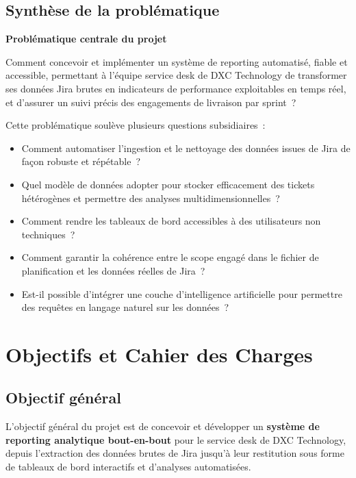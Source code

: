 \documentclass[12pt, a4paper]{report}
\begin{document}
\section{Synthèse de la problématique}

\begin{infobox}
\textbf{Problématique centrale du projet}

\medskip
Comment concevoir et implémenter un système de reporting automatisé, fiable et accessible, permettant à l'équipe service desk de DXC Technology de transformer ses données Jira brutes en indicateurs de performance exploitables en temps réel, et d'assurer un suivi précis des engagements de livraison par sprint~?
\end{infobox}

Cette problématique soulève plusieurs questions subsidiaires~:

\begin{itemize}[leftmargin=2em]
    \item Comment automatiser l'ingestion et le nettoyage des données issues de Jira de façon robuste et répétable~?
    \item Quel modèle de données adopter pour stocker efficacement des tickets hétérogènes et permettre des analyses multidimensionnelles~?
    \item Comment rendre les tableaux de bord accessibles à des utilisateurs non techniques~?
    \item Comment garantir la cohérence entre le scope engagé dans le fichier de planification et les données réelles de Jira~?
    \item Est-il possible d'intégrer une couche d'intelligence artificielle pour permettre des requêtes en langage naturel sur les données~?
\end{itemize}

\chapter{Objectifs et Cahier des Charges}

\section{Objectif général}

L'objectif général du projet est de concevoir et développer un \textbf{système de reporting analytique bout-en-bout} pour le service desk de DXC Technology, depuis l'extraction des données brutes de Jira jusqu'à leur restitution sous forme de tableaux de bord interactifs et d'analyses automatisées.
\end{document}
